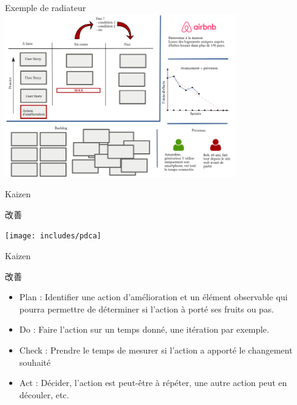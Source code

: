 \documentclass{beamer}
\begin{document}
\begin{frame}{Exemple de radiateur}
  \center
  \includegraphics[width=10cm]{includes/radiateur}
\end{frame}

\begin{frame}{Kaizen 
    {\begin{CJK*}{UTF8}{mj} 改善 \end{CJK*}}
  }
  \center
  \texttt{[image: includes/pdca]}
\end{frame}

\begin{frame}{Kaizen 
    {\begin{CJK*}{UTF8}{mj} 改善 \end{CJK*}}
  }
  
  \begin{itemize}
    \item \alert{Plan} : Identifier une action d'amélioration et un élément observable qui pourra permettre de déterminer si l'action à porté ses fruits ou pas.
    \item \alert{Do} : Faire l'action sur un temps donné, une itération par exemple.
    \item \alert{Check} : Prendre le temps de mesurer si l'action a apporté le changement souhaité
    \item \alert{Act} : Décider, l'action est peut-être à répéter, une autre action peut en découler, etc.
  \end{itemize}

\end{frame}

\end{document}
